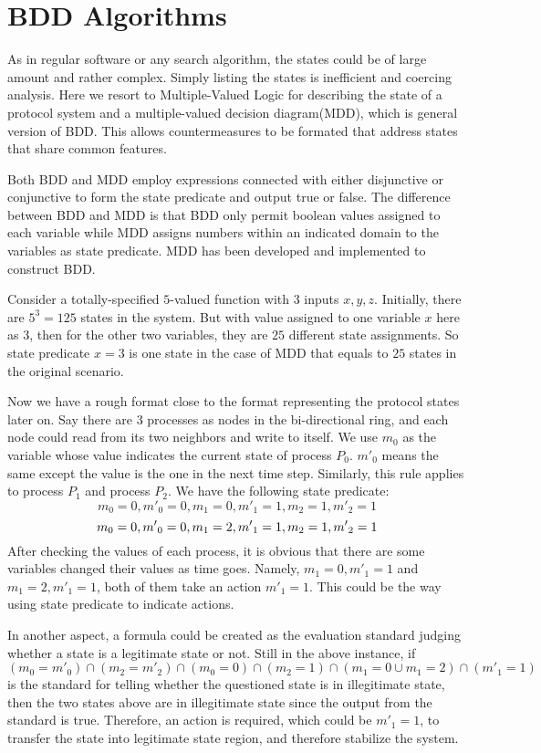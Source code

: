 \section{BDD Algorithms}
As in regular software or any search algorithm, the states could be of large amount and rather complex. Simply listing the states is inefficient and coercing analysis. Here we resort to Multiple-Valued Logic for describing the state of a protocol system and a multiple-valued decision diagram(MDD), which is general version of BDD. This allows countermeasures to be formated that address states that share common features. 

Both BDD and MDD employ expressions connected with either disjunctive or conjunctive to form the state predicate and output true or false. The difference between BDD and MDD is that BDD only permit boolean values assigned to each variable while MDD assigns numbers within an indicated domain to the variables as state predicate. MDD has been developed and implemented to construct BDD. 

Consider a totally-specified $5$-valued function with $3$ inputs $x, y, z$. Initially, there are $5^3 = 125$ states in the system. But with value assigned to one variable $x$ here as $3$, then for the other two variables, they are $25$ different state assignments. So state predicate $x=3$ is one state in the case of MDD that equals to $25$ states in the original scenario. 

Now we have a rough format close to the format representing the protocol states later on. Say there are 3 processes as nodes in the bi-directional ring, and each node could read from its two neighbors and write to itself. We use $m_0$ as the variable whose value indicates the current state of process $P_0$. ${m'}_0$ means the same except the value is the one in the next time step. Similarly, this rule applies to process $P_1$ and process $P_2$. We have the following state predicate:
\[
    m_0 = 0, {m'}_0 = 0, m_1 = 0, {m'}_1 = 1, m_2 = 1, {m'}_2 = 1
\]
\[
    m_0 = 0, {m'}_0 = 0, m_1 = 2, {m'}_1 = 1, m_2 = 1, {m'}_2 = 1\\
\]
After checking the values of each process, it is obvious that there are some variables changed their values as time goes. Namely, $m_1 = 0, {m'}_1 = 1$ and $m_1 = 2, {m'}_1 = 1$, both of them take an action ${m'}_1 = 1$. This could be the way using state predicate to indicate actions.

In another aspect, a formula could be created as the evaluation standard judging whether a state is a legitimate state or not. Still in the above instance, if $(m_0={m'}_0)\cap (m_2={m'}_2)\cap (m_0=0)\cap (m_2=1)\cap (m_1=0\cup m_1=2)\cap ({m'}_1=1)$ is the standard for telling whether the questioned state is in illegitimate state, then the two states above are in illegitimate state since the output from the standard is true. Therefore, an action is required, which could be ${m'}_1=1$, to transfer the state into legitimate state region, and therefore stabilize the system.

